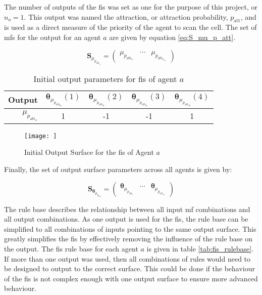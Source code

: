 \documentclass[conference]{IEEEtran}
\begin{document}
The number of outputs of the \gls{fis} was set as one for the purpose of this project, or $n_{o} = 1$.
This output was named the attraction, or attraction probability, $p_{\text{att}}$, and is used as a direct measure of the priority of the agent to scan the cell.
The set of \gls{mf}s for the output for an agent $a$ are given by equation \ref{eq:S_mu_p_att}.

\begin{equation} \label{eq:S_mu_p_att}
    \bm{S}_{\mu_{p_{\text{att}_{a}}}} = 
    \begin{pmatrix}
        \mu_{p_{\text{att}_{a_{1}}}} & \cdots & \mu_{p_{\text{att}_{a_{n_{\mu}}}}}
    \end{pmatrix}
\end{equation}

\begin{table}[h]
    \centering
    \caption{Initial output parameters for \gls{fis} of agent $a$}
    \label{tab:fis_output_params}
    \begin{tabular}{r|cccc}
        \toprule
        Output & $\bm{\theta}_{\mu_{p_{\text{att}_{a}}}}(1)$ & $\bm{\theta}_{\mu_{p_{\text{att}_{a}}}}(2)$ & $\bm{\theta}_{\mu_{p_{\text{att}_{a}}}}(3)$ & $\bm{\theta}_{\mu_{p_{\text{att}_{a}}}}(4)$ \\
        \midrule
         $\mu_{p_{\text{att}_{a}}}$ & 1 & -1 & -1 & 1 \\
        \bottomrule
    \end{tabular}
\end{table}

\begin{figure}
    \centering
    \texttt{[image: ]}
    \caption{Initial Output Surface for the \gls{fis} of Agent $a$}
    \label{fig:diagram_initialOutputSurface}
\end{figure}

Finally, the set of output surface parameters across all agents is given by:

\begin{equation} \label{eq:S_mu_p_att}
    \bm{S}_{\bm{\theta}_{\mu_{p_{\text{att}}}}} = 
    \begin{pmatrix}
        \bm{\theta}_{\mu_{p_{\text{att}_{1}}}} & \cdots & \bm{\theta}_{\mu_{p_{\text{att}_{n_{a}}}}}
    \end{pmatrix}
\end{equation}

The rule base describes the relationship between all input \gls{mf} combinations and all output combinations.
As one output is used for the \gls{fis}, the rule base can be simplified to all combinations of inputs pointing to the same output surface.
This greatly simplifies the \gls{fis} by effectively removing the influence of the rule base on the output.
The \gls{fis} rule base for each agent $a$ is given in table \ref{tab:fis_rulebase}.
If more than one output was used, then all combinations of rules would need to be designed to output to the correct surface.
This could be done if the behaviour of the \gls{fis} is not complex enough with one output surface to ensure more advanced behaviour.
\end{document}
